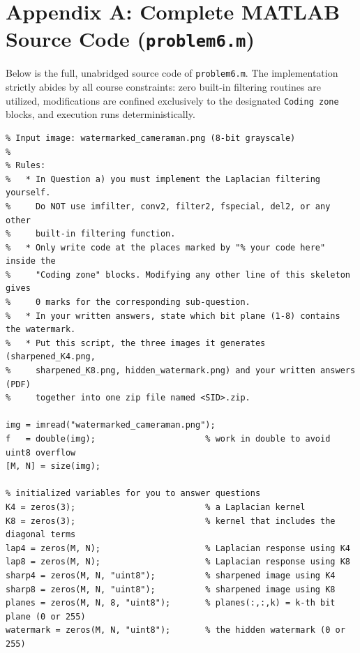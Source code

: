 \documentclass[11pt,a4paper]{article}
\begin{document}
\newpage
\appendix
\section{Appendix A: Complete MATLAB Source Code (\texttt{problem6.m})}
\label{sec:matlab_code}
Below is the full, unabridged source code of \texttt{problem6.m}. The implementation strictly abides by all course constraints: zero built-in filtering routines are utilized, modifications are confined exclusively to the designated \texttt{Coding zone} blocks, and execution runs deterministically.

\begin{lstlisting}[caption={Complete and unabridged implementation of \texttt{problem6.m}.}]
%% COMP4421 Assignment 1 - Programming Problem 6 (20 pts)
% Input image: watermarked_cameraman.png (8-bit grayscale)
%
% Rules:
%   * In Question a) you must implement the Laplacian filtering yourself.
%     Do NOT use imfilter, conv2, filter2, fspecial, del2, or any other
%     built-in filtering function.
%   * Only write code at the places marked by "% your code here" inside the
%     "Coding zone" blocks. Modifying any other line of this skeleton gives
%     0 marks for the corresponding sub-question.
%   * In your written answers, state which bit plane (1-8) contains the watermark.
%   * Put this script, the three images it generates (sharpened_K4.png,
%     sharpened_K8.png, hidden_watermark.png) and your written answers (PDF)
%     together into one zip file named <SID>.zip.

img = imread("watermarked_cameraman.png");
f   = double(img);                      % work in double to avoid uint8 overflow
[M, N] = size(img);

% initialized variables for you to answer questions
K4 = zeros(3);                          % a Laplacian kernel
K8 = zeros(3);                          % kernel that includes the diagonal terms
lap4 = zeros(M, N);                     % Laplacian response using K4
lap8 = zeros(M, N);                     % Laplacian response using K8
sharp4 = zeros(M, N, "uint8");          % sharpened image using K4
sharp8 = zeros(M, N, "uint8");          % sharpened image using K8
planes = zeros(M, N, 8, "uint8");       % planes(:,:,k) = k-th bit plane (0 or 255)
watermark = zeros(M, N, "uint8");       % the hidden watermark (0 or 255)


\end{lstlisting}
\end{document}
